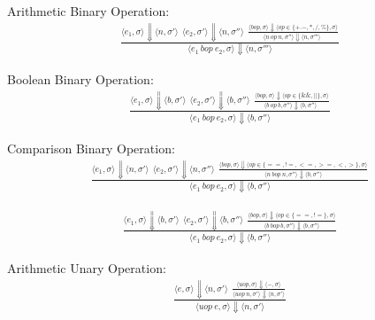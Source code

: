 \documentclass[12pt]{article}
\begin{document}
	Arithmetic Binary Operation:
	\begin{align*}
		\frac{
		\langle e_1, \sigma \rangle\Downarrow \langle n, \sigma' \rangle \ \ 
		\langle e_2, \sigma' \rangle\Downarrow \langle n, \sigma'' \rangle \ \ 
		\frac{
			\langle bop, \sigma \rangle\Downarrow \langle op \in \{+. -, *, /, \%\} , \sigma \rangle
		}{
			\langle n\ op\ n, \sigma'' \rangle\Downarrow \langle n, \sigma''' \rangle \ \ 
		}}
		{\langle e_1\ bop\ e_2, \sigma \rangle\Downarrow \langle n, \sigma''' \rangle}
	\end{align*}


	Boolean Binary Operation:
	\begin{align*}
		\frac{
		\langle e_1, \sigma \rangle\Downarrow \langle b, \sigma' \rangle \ \ 
		\langle e_2, \sigma' \rangle\Downarrow \langle b, \sigma'' \rangle \ \ 
		\frac{
			\langle bop, \sigma \rangle\Downarrow \langle op \in \{\&\&, ||\} , \sigma \rangle
		}{
			\langle b\ op\ b, \sigma'' \rangle\Downarrow \langle b, \sigma'' \rangle \ \ 
		}}
		{\langle e_1\ bop\ e_2, \sigma \rangle\Downarrow \langle b, \sigma'' \rangle}
	\end{align*}


	Comparison Binary Operation:
	\begin{align*}
		\frac{
		\langle e_1, \sigma \rangle\Downarrow \langle n, \sigma' \rangle \ \ 
		\langle e_2, \sigma' \rangle\Downarrow \langle n, \sigma'' \rangle \ \
		\frac{
			\langle bop, \sigma \rangle\Downarrow \langle op \in \{==, !=, <=, >=, <, >\} , \sigma \rangle
		}{
			\langle n\ bop\ n, \sigma'' \rangle\Downarrow \langle b, \sigma'' \rangle
		}}
		{\langle e_1\ bop\ e_2, \sigma \rangle\Downarrow \langle b, \sigma'' \rangle}
	\end{align*}
	
	\begin{align*}
		\frac{
		\langle e_1, \sigma \rangle\Downarrow \langle b, \sigma' \rangle \ \ 
		\langle e_2, \sigma' \rangle\Downarrow \langle b, \sigma'' \rangle \ \
		\frac{
			\langle bop, \sigma \rangle\Downarrow \langle op \in \{==, !=\} , \sigma \rangle
		}{
			\langle b\ bop\ b, \sigma'' \rangle\Downarrow \langle b, \sigma'' \rangle
		}}
		{\langle e_1\ bop\ e_2, \sigma \rangle\Downarrow \langle b, \sigma'' \rangle}
	\end{align*}


	Arithmetic Unary Operation:
	\begin{align*}
		\frac{
		\langle e, \sigma \rangle\Downarrow \langle n, \sigma' \rangle \ \ 
		\frac{
			\langle uop, \sigma \rangle\Downarrow \langle -, \sigma \rangle
		}{
			\langle uop\ n, \sigma' \rangle\Downarrow \langle n, \sigma' \rangle
		}}
		{\langle uop\ e, \sigma \rangle\Downarrow \langle n, \sigma' \rangle}
	\end{align*}
\end{document}
